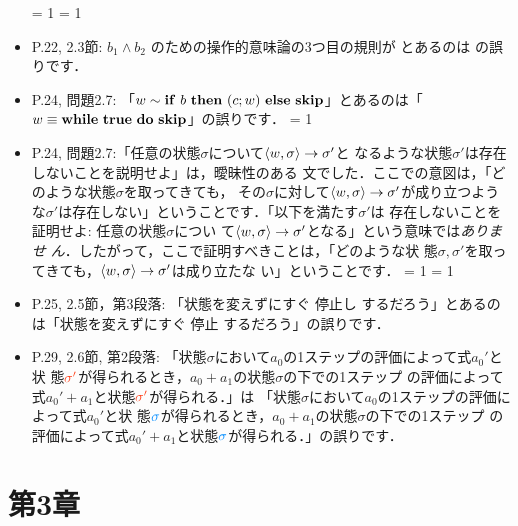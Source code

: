 \documentclass[12pt,titlepage,twoside,openright,dvipdfmx]{jsbook}
\newcommand\old[1]{%
  \textcolor[rgb]{1.0,0.25,0.1}{#1}%
  }
\newcommand\new[1]{%
  \textcolor[rgb]{0,0.55,1.0}{#1}%
  }
\theoremstyle{definition}
\begin{document}
\begin{itemize}
\ifnum \VersionNum = 1
\ifnum \PrintNum = 1
  \item P.22, 2.3節: $b_1 \land b_2$ のための操作的意味論の3つ目の規則が
    \infrule
    { \arrow \Ttrue \andalso {} \arrow \Ttrue}
    { \arrow \old{\Tfalse}}
    とあるのは
    \infrule
    { \arrow \Ttrue \andalso {} \arrow \Ttrue}
    { \arrow \new{\Ttrue}}
    の誤りです．
  \item P.24, 問題2.7: 「$w \sim \mathbf{if}\ b\ \mathbf{then}\ (c;w)\ \mathbf{else}\ \mathbf{skip}$」とあるのは「$w \equiv \mathbf{while}\ \mathbf{true}\ \mathbf{do}\ \mathbf{skip}$」の誤りです．
    \fi
    \fi
\ifnum \VersionNum = 1
  \item P.24,
    問題2.7:「任意の状態$\sigma$について$\langle{w,\sigma}\rangle\to \sigma'$と
    なるような状態$\sigma'$は存在しないことを説明せよ」は，曖昧性のある
    文でした．ここでの意図は，「どのような状態$\sigma$を取ってきても，
    その$\sigma$に対して$\langle{w,\sigma}\rangle\to \sigma'$が成り立つよう
    な$\sigma'$は存在しない」ということです．「以下を満たす$\sigma'$は
    存在しないことを証明せよ: 任意の状態$\sigma$につい
    て$\langle{w,\sigma}\rangle\to \sigma'$となる」という意味では\emph{ありませ
      ん}．したがって，ここで証明すべきことは，「どのような状
    態$\sigma,
    \sigma'$を取ってきても，$\langle{w,\sigma}\rangle \to \sigma'$は成り立たな
    い」ということです．
\fi
\ifnum \VersionNum = 1
\ifnum \PrintNum = 1
  \item P.25, 2.5節，第3段落: 「状態を変えずにすぐ\old{停止し}するだろう」とあるのは「状態を変えずにすぐ\new{停止}するだろう」の誤りです．
  \item P.29, 2.6節, 第2段落:
    「状態$\sigma$において$a_0$の1ステップの評価によって式$a_0'$と状
    態$\old{\sigma'}$が得られるとき，$a_0+a_1$の状態$\sigma$の下での1ステップ
    の評価によって式$a_0'+a_1$と状態$\old{\sigma'}$が得られる．」は
    「状態$\sigma$において$a_0$の1ステップの評価によって式$a_0'$と状
    態$\new{\sigma}$が得られるとき，$a_0+a_1$の状態$\sigma$の下での1ステップ
    の評価によって式$a_0'+a_1$と状態$\new{\sigma}$が得られる．」の誤りです．
\fi
\fi
\end{itemize}

\section*{第3章}

\newcommand{\AexpBinPropB}{
  \forall{a_0,a_1\in\mathbf{Aexp},\sigma\in\Sigma,m,n\in\mathbf{N}}. \\ &
  \tuple{a_0,\sigma}\rightarrow m \AND
  \tuple{a_1,\sigma}\rightarrow n \AND
}
\end{document}
